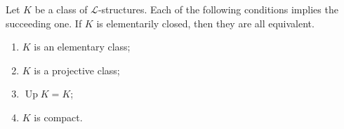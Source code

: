 Let $K$ be a class of $\mathcal{L}$-structures. Each of the following conditions implies the succeeding one. If $K$ is elementarily closed, then they are all equivalent.
\begin{enumerate}
\item[(i)] $K$ is an elementary class;
\item[(ii)] $K$ is a projective class;
\item[(iii)] $\operatorname{Up} K = K$;
\item[(iv)] $K$ is compact.
\end{enumerate}
